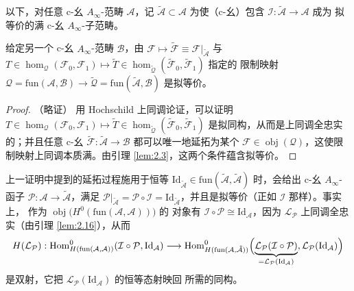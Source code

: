 以下，对任意 c-幺 $A_\infty$-范畴 $\mathcal A$，记 $\tilde{\mathcal A}\subset
\mathcal A$ 为使（c-幺）包含 $\mathcal I:\tilde{\mathcal A}\to\mathcal A$ 成为
拟等价的满 c-幺 $A_\infty$-子范畴。

\begin{Lem}\label{lem:2.30}
给定另一个 c-幺 $A_\infty$-范畴 $\mathcal B$，由 $\mathcal F\mapsto
\tilde{\mathcal F}\equiv\mathcal F|_{\tilde{\mathcal A}}$ 与
$T\in\hom_{\mathcal Q}(\mathcal F_0,\mathcal F_1)\mapsto\tilde T\in
\hom_{\tilde{\mathcal Q}}(\tilde{\mathcal F}_0,\tilde{\mathcal F}_1)$ 指定的
限制映射 $\mathcal Q=\mathrm{fun}(\mathcal A,\mathcal B)\to\tilde{\mathcal Q}=
\mathrm{fun}(\tilde{\mathcal A},\mathcal B)$ 是拟等价。
\end{Lem}

\begin{proof}（略证）
用 Hochschild 上同调论证，可以证明 $T\in\hom_{\mathcal Q}(\mathcal F_0,\mathcal F_1)
\mapsto\tilde T\in\hom_{\tilde{\mathcal Q}}(\tilde{\mathcal F}_0,
\tilde{\mathcal F}_1)$ 是拟同构，从而是上同调全忠实的；并且任意 c-幺
$\tilde{\mathcal F}:\tilde{\mathcal A}\to\mathcal B$ 都可以唯一地延拓为某个
$\mathcal F\in\operatorname{obj}(\mathcal Q)$，这使限制映射上同调本质满。由引理 \ref{lem:2.3}，这两个条件蕴含拟等价。
\end{proof}

上一证明中提到的延拓过程施用于恒等 $\mathrm{Id}_{\tilde{\mathcal A}}\in\mathrm{fun}
(\tilde{\mathcal A},\tilde{\mathcal A})$ 时，会给出 c-幺 $A_\infty$-函子
$\mathcal P:\mathcal A\to\tilde{\mathcal A}$，满足
$\mathcal P|_{\tilde{\mathcal A}}=\mathcal P\circ\mathcal I=
\mathrm{Id}_{\tilde{\mathcal A}}$，并且是拟等价（正如 $\mathcal I$ 那样）。事实上，
作为 $\operatorname{obj}\bigl(H^0(\mathrm{fun}(\mathcal A,\mathcal A))\bigr)$ 的
对象有 $\mathcal I\circ\mathcal P\cong\mathrm{Id}_{\mathcal A}$，因为
$\mathcal L_{\mathcal P}$ 上同调全忠实（由引理 \ref{lem:2.16}），从而
\[
  H(\mathcal L_{\mathcal P}):\operatorname{Hom}^0_{H(\mathrm{fun}(\mathcal A,\mathcal A))}
  (\mathcal I\circ\mathcal P,\mathrm{Id}_{\mathcal A})\longrightarrow
  \operatorname{Hom}^0_{H(\mathrm{fun}(\mathcal A,\tilde{\mathcal A}))}\Bigl(
  \underbrace{\mathcal L_{\mathcal P}(\mathcal I\circ\mathcal P)}
  _{=\mathcal L_{\mathcal P}(\mathrm{Id}_{\mathcal A})},
  \mathcal L_{\mathcal P}(\mathrm{Id}_{\mathcal A})\Bigr)
\]
是双射，它把 $\mathcal L_{\mathcal P}(\mathrm{Id}_{\mathcal A})$ 的恒等态射映回
所需的同构。

